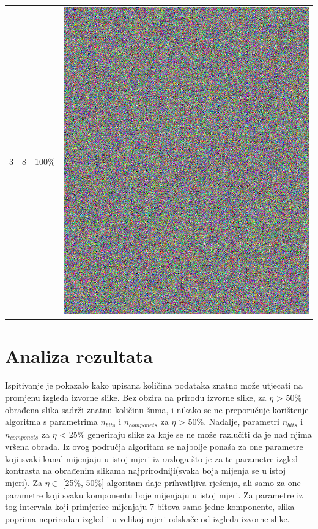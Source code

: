 \documentclass[times, utf8, seminar]{fer}
\begin{document}
\begin{center}
\begin{longtable}{|c|c|c|c|}
3 & 8 &100\% & \includegraphics[scale=0.3]{../benchmark_results/pattern/3_components-8_bits.png} \\
\end{longtable}
\end{center}

\section{Analiza rezultata}
\paragraph{}
Ispitivanje je pokazalo kako upisana količina podataka znatno može utjecati na promjenu izgleda izvorne slike. Bez obzira na prirodu izvorne slike, za $\eta$ > 50\% obrađena slika sadrži znatnu količinu šuma, i nikako se ne preporučuje korištenje algoritma s parametrima $n_{bits}$ i $n_{componets}$ za $\eta$ > 50\%. Nadalje, parametri $n_{bits}$ i $n_{componets}$ za $\eta$ < 25\% generiraju slike za koje se ne može razlučiti da je nad njima vršena obrada. Iz ovog područja algoritam se najbolje ponaša za one parametre koji svaki kanal mijenjaju u istoj mjeri iz razloga što je za te parametre izgled kontrasta na obrađenim slikama najprirodniji(svaka boja mijenja se u istoj mjeri). Za $\eta \in$ [25\%, 50\%] algoritam daje prihvatljiva rješenja, ali samo za one parametre koji svaku komponentu boje mijenjaju u istoj mjeri. Za parametre iz tog intervala koji primjerice mijenjaju 7 bitova samo jedne komponente, slika poprima neprirodan izgled i u velikoj mjeri odskače od izgleda izvorne slike.
\end{document}
